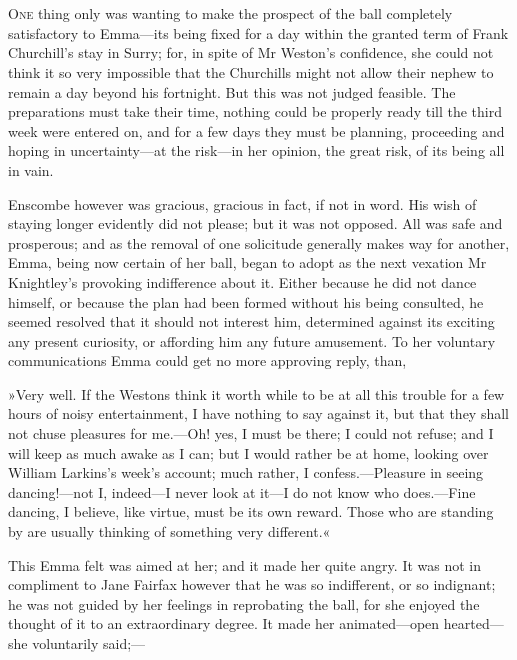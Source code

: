 \chapter[Chapter \thechapter]{}
\lettrine[lines=4,lraise=0.3]{O}{ne} thing only was wanting to make the prospect of the ball completely satisfactory to Emma—its being fixed for a day within the granted term of Frank Churchill's stay in Surry; for, in spite of Mr Weston's confidence, she could not think it so very impossible that the Churchills might not allow their nephew to remain a day beyond his fortnight. But this was not judged feasible. The preparations must take their time, nothing could be properly ready till the third week were entered on, and for a few days they must be planning, proceeding and hoping in uncertainty—at the risk—in her opinion, the great risk, of its being all in vain.

Enscombe however was gracious, gracious in fact, if not in word. His wish of staying longer evidently did not please; but it was not opposed. All was safe and prosperous; and as the removal of one solicitude generally makes way for another, Emma, being now certain of her ball, began to adopt as the next vexation Mr Knightley's provoking indifference about it. Either because he did not dance himself, or because the plan had been formed without his being consulted, he seemed resolved that it should not interest him, determined against its exciting any present curiosity, or affording him any future amusement. To her voluntary communications Emma could get no more approving reply, than,

»Very well. If the Westons think it worth while to be at all this trouble for a few hours of noisy entertainment, I have nothing to say against it, but that they shall not chuse pleasures for me.—Oh! yes, I must be there; I could not refuse; and I will keep as much awake as I can; but I would rather be at home, looking over William Larkins's week's account; much rather, I confess.—Pleasure in seeing dancing!—not I, indeed—I never look at it—I do not know who does.—Fine dancing, I believe, like virtue, must be its own reward. Those who are standing by are usually thinking of something very different.«

This Emma felt was aimed at her; and it made her quite angry. It was not in compliment to Jane Fairfax however that he was so indifferent, or so indignant; he was not guided by her feelings in reprobating the ball, for she enjoyed the thought of it to an extraordinary degree. It made her animated—open hearted—she voluntarily said;—


